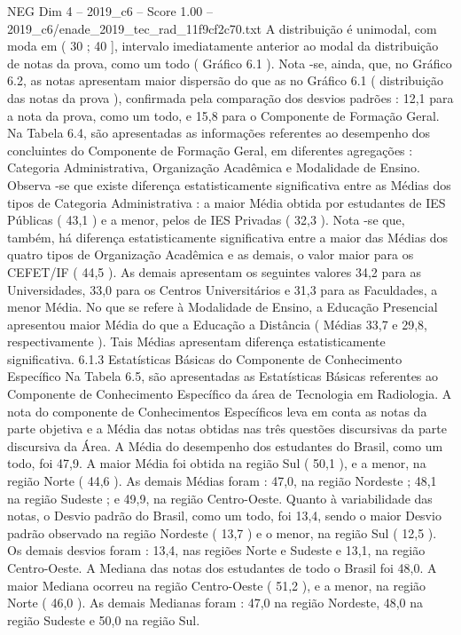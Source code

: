 \begin{textsample}{NEG Dim 4 – 2019\_c6 – Score 1.00 – 2019\_c6/enade\_2019\_tec\_rad\_11f9cf2c70.txt}
A distribuição é unimodal, com moda em ( 30 ; 40 ], intervalo imediatamente anterior ao modal da distribuição de notas da prova, como um todo ( Gráfico 6.1 ).
Nota -se, ainda, que, no Gráfico 6.2, as notas apresentam maior dispersão do que as no Gráfico 6.1 ( distribuição das notas da prova ), confirmada pela comparação dos desvios padrões : 12,1 para a nota da prova, como um todo, e 15,8 para o Componente de Formação Geral.
Na Tabela 6.4, são apresentadas as informações referentes ao desempenho dos concluintes do Componente de Formação Geral, em diferentes agregações : Categoria Administrativa, Organização Acadêmica e Modalidade de Ensino.
Observa -se que existe diferença estatisticamente significativa entre as Médias dos tipos de Categoria Administrativa : a maior Média obtida por estudantes de IES Públicas ( 43,1 ) e a menor, pelos de IES Privadas ( 32,3 ).
Nota -se que, também, há diferença estatisticamente significativa entre a maior das Médias dos quatro tipos de Organização Acadêmica e as demais, o valor maior para os CEFET/IF ( 44,5 ).
As demais apresentam os seguintes valores 34,2 para as Universidades, 33,0 para os Centros Universitários e 31,3 para as Faculdades, a menor Média.
No que se refere à Modalidade de Ensino, a Educação Presencial apresentou maior Média do que a Educação a Distância ( Médias 33,7 e 29,8, respectivamente ).
Tais Médias apresentam diferença estatisticamente significativa. 6.1.3 Estatísticas Básicas do Componente de Conhecimento Específico Na Tabela 6.5, são apresentadas as Estatísticas Básicas referentes ao Componente de Conhecimento Específico da área de Tecnologia em Radiologia.
A nota do componente de Conhecimentos Específicos leva em conta as notas da parte objetiva e a Média das notas obtidas nas três questões discursivas da parte discursiva da Área.
A Média do desempenho dos estudantes do Brasil, como um todo, foi 47,9.
A maior Média foi obtida na região Sul ( 50,1 ), e a menor, na região Norte ( 44,6 ).
As demais Médias foram : 47,0, na região Nordeste ; 48,1 na região Sudeste ; e 49,9, na região Centro-Oeste.
Quanto à variabilidade das notas, o Desvio padrão do Brasil, como um todo, foi 13,4, sendo o maior Desvio padrão observado na região Nordeste ( 13,7 ) e o menor, na região Sul ( 12,5 ).
Os demais desvios foram : 13,4, nas regiões Norte e Sudeste e 13,1, na região Centro-Oeste.
A Mediana das notas dos estudantes de todo o Brasil foi 48,0.
A maior Mediana ocorreu na região Centro-Oeste ( 51,2 ), e a menor, na região Norte ( 46,0 ).
As demais Medianas foram : 47,0 na região Nordeste, 48,0 na região Sudeste e 50,0 na região Sul.

\end{textsample}
